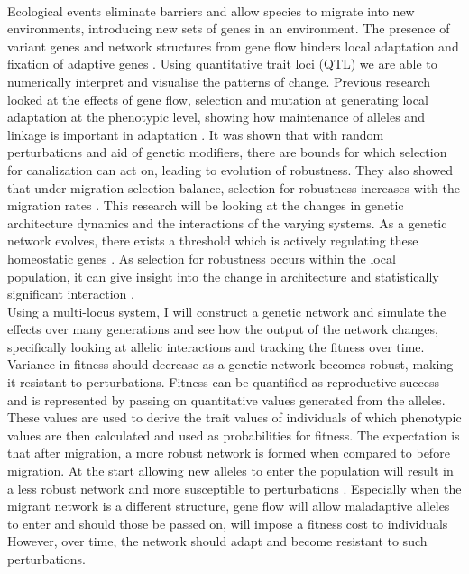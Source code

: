 \\Ecological events eliminate barriers and allow species to migrate into new environments, introducing new sets of genes in an environment. The presence of variant genes and network structures from gene flow hinders local adaptation and fixation of adaptive genes \cite{burt1995evolution}. Using quantitative trait loci (QTL) we are able to numerically interpret and visualise the patterns of change. Previous research looked at the effects of gene flow, selection and mutation at generating local adaptation at the phenotypic level, showing how maintenance of alleles and linkage is important in adaptation \cite{yeaman2011genetic}. It was shown that with random perturbations and aid of genetic modifiers, there are bounds for which selection for canalization can act on, leading to evolution of robustness. They also showed that under migration selection balance, selection for robustness increases with the migration rates \cite{proulx2005opportunity}. This research will be looking at the changes in genetic architecture dynamics and the interactions of the varying systems. As a genetic network evolves, there exists a threshold which is actively regulating these homeostatic genes \cite{gjuvsland2007threshold}. As selection for robustness occurs within the local population, it can give insight into the change in architecture and statistically significant interaction \cite{gjuvsland2007statistical}.
\\Using a multi-locus system, I will construct a genetic network and simulate the effects over many generations and see how the output of the network changes, specifically looking at allelic interactions and tracking the fitness over time. Variance in fitness should decrease as a genetic network becomes robust, making it resistant to perturbations. Fitness can be quantified as reproductive success and is represented by passing on quantitative values generated from the alleles. These values are used to derive the trait values of individuals of which phenotypic values are then calculated and used as probabilities for fitness. The expectation is that after migration, a more robust network is formed when compared to before migration. At the start allowing new alleles to enter the population will result in a less robust network and more susceptible to perturbations \cite{garcia1997genetic}. Especially when the migrant network is a different structure, gene flow will allow maladaptive alleles to enter and should those be passed on, will impose a fitness cost to individuals \cite{tigano2016genomics} However, over time, the network should adapt and become resistant to such perturbations.
